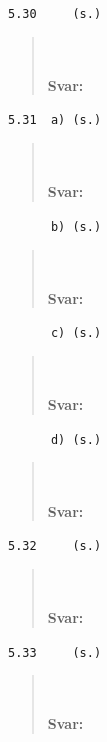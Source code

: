 \documentclass[a4paper]{article}
\newcommand{\tskcol}[1]{\textcolor{tskcol}{#1}}
\begin{document}
	\texttt{\tskcol{5.30~~~~ (s.)}}
	\begin{quotation}
		\noindent
		\\ \\
		\textbf{Svar:}
	\end{quotation}
	
	\texttt{\tskcol{5.31~~a) (s.)}}
	\begin{quotation}
		\noindent
		\\ \\
		\textbf{Svar:}
	\end{quotation}
	
	\texttt{\tskcol{~~~~~~b) (s.)}}
	\begin{quotation}
		\noindent
		\\ \\
		\textbf{Svar:}
	\end{quotation}
	
	\texttt{\tskcol{~~~~~~c) (s.)}}
	\begin{quotation}
		\noindent
		\\ \\
		\textbf{Svar:}
	\end{quotation}
	
	\texttt{\tskcol{~~~~~~d) (s.)}}
	\begin{quotation}
		\noindent
		\\ \\
		\textbf{Svar:}
	\end{quotation}
	
	\texttt{\tskcol{5.32~~~~ (s.)}}
	\begin{quotation}
		\noindent
		\\ \\
		\textbf{Svar:}
	\end{quotation}
	
	\texttt{\tskcol{5.33~~~~ (s.)}}
	\begin{quotation}
		\noindent
		\\ \\
		\textbf{Svar:}
	\end{quotation}
\end{document}
